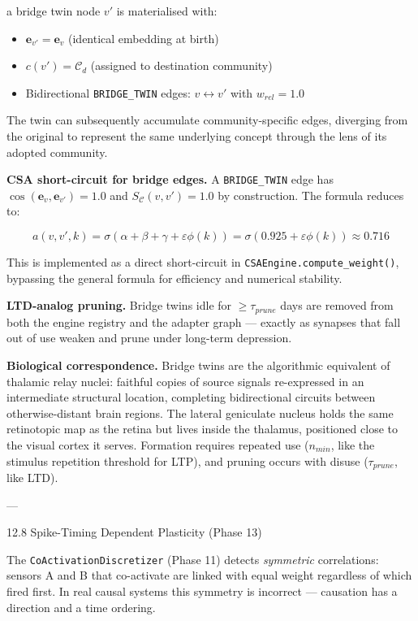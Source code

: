 \documentclass[10pt,journal,compsoc]{IEEEtran}
\begin{document}
a bridge twin node $v'$ is mater\-ialised with:
\begin{itemize}
\item $\mathbf{e}_{v'} = \mathbf{e}_v$ (identical embedding at birth)
\item $c(v') = \mathcal{C}_d$ (assigned to destination community)
\item Bidire\-ctional \texttt{BRIDGE\_TWIN} edges: $v \leftrightarrow v'$ with $w_{rel} = 1.0$

\end{itemize}
The twin can subse\-quently accumulate community-specific edges, diverging from the original to represent the same underlying concept through the lens of its adopted community.

\textbf{CSA short-circuit for bridge edges.} A \texttt{BRIDGE\_TWIN} edge has $\cos(\mathbf{e}_v, \mathbf{e}_{v'}) = 1.0$ and $S_\mathcal{C}(v, v') = 1.0$ by const\-ruction. The formula reduces to:

\begin{equation}
a(v, v', k) = \sigma\!\left(\alpha + \beta + \gamma + \varepsilon\phi(k)\right) = \sigma(0.925 + \varepsilon\phi(k)) \approx 0.716
\end{equation}

This is implemented as a direct short-circuit in \texttt{CSAEngine.compute\_weight()}, bypassing the general formula for efficiency and numerical stability.

\textbf{LTD-analog pruning.} Bridge twins idle for $\geq \tau_{prune}$ days are removed from both the engine registry and the adapter graph — exactly as synapses that fall out of use weaken and prune under long-term depression.

\textbf{Biological corre\-spondence.} Bridge twins are the algorithmic equivalent of thalamic relay nuclei: faithful copies of source signals re-expressed in an inter\-mediate structural location, completing bidir\-ectional circuits between otherwise-distant brain regions. The lateral geniculate nucleus holds the same retinotopic map as the retina but lives inside the thalamus, positioned close to the visual cortex it serves. Formation requires repeated use ($n_{min}$, like the stimulus repetition threshold for LTP), and pruning occurs with disuse ($\tau_{prune}$, like LTD).

---

12.8 Spike-Timing Dependent Plasticity (Phase 13)

The \texttt{CoActivationDiscretizer} (Phase 11) detects \textit{symmetric} corre\-lations: sensors A and B that co-activate are linked with equal weight regardless of which fired first. In real causal systems this symmetry is incorrect — causation has a direction and a time ordering.
\end{document}
